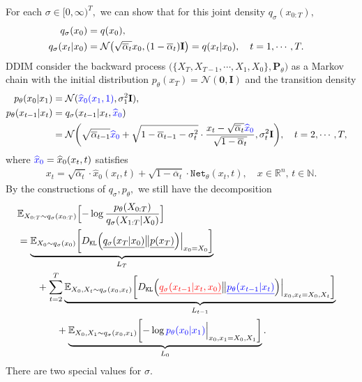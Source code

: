 \documentclass[
]{article}
\theoremstyle{remark}
\begin{document}
For each \(\sigma\in [0,\infty)^T,\) we can show that for this joint
density \(q_{\sigma}(x_{0:T}),\) \[
\begin{aligned}
  q_{\sigma}(x_0) &= q(x_0), \cr
  q_{\sigma} (x_t \vert x_0) &= \mathcal{N} \bigl(\sqrt{\overline{\alpha}_t}x_0, (1-\overline{\alpha}_t)\mathbf{I}\bigr) = q(x_t\vert x_0) , \quad t=1,\cdots,T.
\end{aligned}
\] DDIM consider the backward process
\(\bigl( \lbrace X_T,X_{T-1},\cdots,X_1,X_0 \rbrace, \mathbf{P}_{\theta} \bigr)\)
as a Markov chain with the initial distribution
\(p_{\theta}({x_T})=\mathcal{N}(\mathbf{0},\mathbf{I})\) and the
transition density \[
\begin{aligned}
  p_{\theta}(x_0\vert x_1) &= \mathcal{N}( {\color{blue}{\widehat{x}_0(x_1,1)}}, \sigma_1^2 \mathbf{I} )  , \cr
  p_{\theta}(x_{t-1}\vert x_t) &= q_{\sigma}(x_{t-1}\vert x_t,{\color{blue}{\widehat{x}_0}}) \cr
  &= \mathcal{N}\biggl( \sqrt{\overline{\alpha}_{t-1}}{\color{blue}{\widehat{x}_0}} + \sqrt{1-\overline{\alpha}_{t-1} - \sigma_t^2} \cdot \frac{x_t-\sqrt{\overline{\alpha}_t}{\color{blue}{\widehat{x}_0}}}{\sqrt{1-\overline{\alpha}_t}} , \sigma_t^2 \mathbf{I} \biggr), \quad t=2,\cdots, T,
\end{aligned}
\] where \({\color{blue}{\widehat{x}_0}}=\widehat{x}_0(x_t,t)\)
satisfies \[
\begin{aligned}
  x_t = \sqrt{\overline{\alpha}_t}\cdot \widehat{x}_0 (x_t,t) + \sqrt{1-\overline{\alpha}_t} \cdot \mathtt{Net}_{\theta}(x_t,t), \quad x\in \mathbb R^n,\, t\in \mathbb N.
\end{aligned}
\] By the constructions of \(q_{\sigma},p_{\theta},\) we still have the
decomposition \[
\begin{aligned}
  &\mathbb E_{X_{0:T}\sim q_{\sigma}(x_{0:T})} \Bigl[ -\log \frac{p_{\theta}(X_{0:T})}{q_{\sigma}(X_{1:T}\vert X_0)} \Bigr] \cr  
  &= \underbrace{\mathbb E_{X_0\sim q_{\sigma}(x_0)} \biggl[ D_{\mathtt{KL}} \Bigl( \underline{q_{\sigma}(x_T \vert x_0)} \big\Vert \underline{p(x_T)} \Bigr) \Big\vert_{x_0=X_0} \biggr]}_{L_T} \cr 
  & \qquad + \sum_{t=2}^T 
  \underbrace{\mathbb E_{X_0,X_t\sim q_{\sigma}(x_0,x_{t})} \biggl[ 
    D_{\mathtt{KL}} \Bigl( 
            {\underline{\color{red}{q_{\sigma}(x_{t-1} \vert x_t,x_0)}}}
            \big\Vert 
            \underline{\color{blue}{p_{\theta}(x_{t-1}\vert x_t)} }
            \Bigr)\Big \vert_{x_0,x_t=X_0,X_t} 
    \biggr]}_{L_{t-1}}  \cr 
    & \qquad \qquad + \underbrace{\mathbb E_{X_0,X_1\sim q_{\sigma}(x_0,x_1)} \biggl[ 
      -\log {\color{blue}{p_{\theta}(x_0 \vert x_1)}} \Big\vert_{x_0,x_1=X_0,X_1}
      \biggr]}_{L_0}.
\end{aligned}
\] There are two special values for \(\sigma.\)
\end{document}
